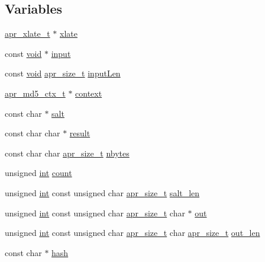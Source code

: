 \subsection*{Variables}
\begin{DoxyCompactItemize}
\item 
\hyperlink{group__APR__XLATE_ga069dabbadc30e3a4157c38104a250e77}{apr\+\_\+xlate\+\_\+t} $\ast$ \hyperlink{group__APR__MD5_gaed437fe94bba952b62c87a7e00e337e9}{xlate}
\item 
const \hyperlink{group__MOD__ISAPI_gacd6cdbf73df3d9eed42fa493d9b621a6}{void} $\ast$ \hyperlink{group__APR__MD5_gae86be9baed5a97497d8444b342aab29b}{input}
\item 
const \hyperlink{group__MOD__ISAPI_gacd6cdbf73df3d9eed42fa493d9b621a6}{void} \hyperlink{group__apr__platform_gaaa72b2253f6f3032cefea5712a27540e}{apr\+\_\+size\+\_\+t} \hyperlink{group__APR__MD5_ga886ddbeed930b962db48a63f95d217d4}{input\+Len}
\item 
\hyperlink{structapr__md5__ctx__t}{apr\+\_\+md5\+\_\+ctx\+\_\+t} $\ast$ \hyperlink{group__APR__MD5_ga4687abaa14e65cdcf4a2d6a8db378d50}{context}
\item 
const char $\ast$ \hyperlink{group__APR__MD5_ga0a678842764ed169d6a8527b30273b7d}{salt}
\item 
const char char $\ast$ \hyperlink{group__APR__MD5_ga95ec363aa31b8127125c2f4a0f6411aa}{result}
\item 
const char char \hyperlink{group__apr__platform_gaaa72b2253f6f3032cefea5712a27540e}{apr\+\_\+size\+\_\+t} \hyperlink{group__APR__MD5_gaf025f70c63174bcb9988a52727657287}{nbytes}
\item 
unsigned \hyperlink{pcre_8txt_a42dfa4ff673c82d8efe7144098fbc198}{int} \hyperlink{group__APR__MD5_ga16ff2d8e15ade4948398b0aeb80124a8}{count}
\item 
unsigned \hyperlink{pcre_8txt_a42dfa4ff673c82d8efe7144098fbc198}{int} const unsigned char \hyperlink{group__apr__platform_gaaa72b2253f6f3032cefea5712a27540e}{apr\+\_\+size\+\_\+t} \hyperlink{group__APR__MD5_ga25cc736ce7b0e901f18b25be67237555}{salt\+\_\+len}
\item 
unsigned \hyperlink{pcre_8txt_a42dfa4ff673c82d8efe7144098fbc198}{int} const unsigned char \hyperlink{group__apr__platform_gaaa72b2253f6f3032cefea5712a27540e}{apr\+\_\+size\+\_\+t} char $\ast$ \hyperlink{group__APR__MD5_ga06377a55be331a76054d54d308c64c79}{out}
\item 
unsigned \hyperlink{pcre_8txt_a42dfa4ff673c82d8efe7144098fbc198}{int} const unsigned char \hyperlink{group__apr__platform_gaaa72b2253f6f3032cefea5712a27540e}{apr\+\_\+size\+\_\+t} char \hyperlink{group__apr__platform_gaaa72b2253f6f3032cefea5712a27540e}{apr\+\_\+size\+\_\+t} \hyperlink{group__APR__MD5_gae4951eb9317c7f920ec3c8a11388356c}{out\+\_\+len}
\item 
const char $\ast$ \hyperlink{group__APR__MD5_gaf86d4a5b21e961280c272d79aacf26ca}{hash}
\end{DoxyCompactItemize}


